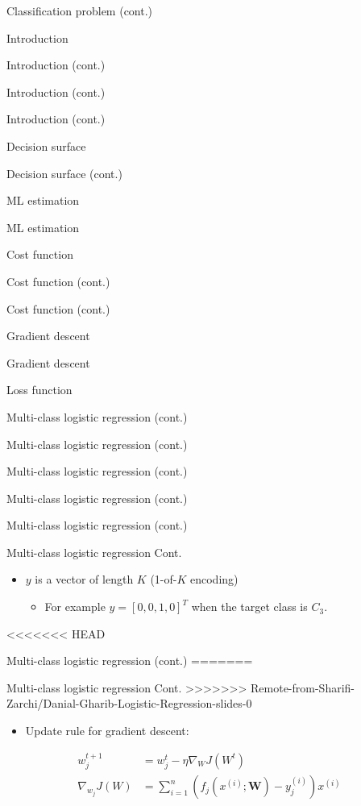 \documentclass[serif, aspectratio=169]{beamer}
\begin{document}
\begin{frame}{Classification problem (cont.)}
\begin{itemize}
\begin{frame}{Introduction}
\begin{itemize}
\begin{frame}{Introduction (cont.)}
\begin{frame}{Introduction (cont.)}
\begin{frame}{Introduction (cont.)}
\begin{frame}{Decision surface}
\begin{itemize}
\begin{frame}{Decision surface (cont.)}
\begin{frame}{ML estimation}
\begin{frame}{ML estimation}
\begin{itemize}
\begin{frame}{Cost function}
\begin{frame}{Cost function (cont.)}
\begin{itemize}
\begin{itemize}
\begin{frame}{Cost function (cont.)}
\begin{frame}{Gradient descent}
\begin{frame}{Gradient descent}
\begin{frame}{Loss function}
\begin{frame}{Multi-class logistic regression (cont.)}
\begin{frame}{Multi-class logistic regression (cont.)}
\begin{frame}{Multi-class logistic regression (cont.)}
\begin{frame}{Multi-class logistic regression (cont.)}
\begin{frame}{Multi-class logistic regression (cont.)}
\begin{frame}{Multi-class logistic regression Cont.}
\begin{itemize}
        \item $y$ is a vector of length $K$ (1-of-$K$ encoding)
            \begin{itemize}
                \item For example $y=[0,0,1,0]^T$ when the target class is $C_3$.
            \end{itemize}
    \end{itemize}
\end{frame}
<<<<<<< HEAD
\begin{frame}{Multi-class logistic regression (cont.)}
=======
\begin{frame}{Multi-class logistic regression Cont.}
>>>>>>> Remote-from-Sharifi-Zarchi/Danial-Gharib-Logistic-Regression-slides-0
    \begin{itemize}
        \item Update rule for gradient descent:
        
    \end{itemize}
    \begin{align*}
            w_j^{t+1} &= w_j^t - \eta \nabla _W J(W^t) \\
            \nabla _{w_{j}} J(W) &= \sum_{i=1}^{n} (f_j(x^{(i)}; \mathbf{W}) - y_j^{(i)})x^{(i)}
        \end{align*}
        

\end{frame}
\end{frame}
\end{frame}
\end{frame}
\end{frame}
\end{frame}
\end{frame}
\end{frame}
\end{frame}
\end{frame}
\end{frame}
\end{itemize}
\end{itemize}
\end{frame}
\end{frame}
\end{itemize}
\end{frame}
\end{frame}
\end{frame}
\end{itemize}
\end{frame}
\end{frame}
\end{frame}
\end{frame}
\end{itemize}
\end{frame}
\end{itemize}
\end{frame}
\end{document}
